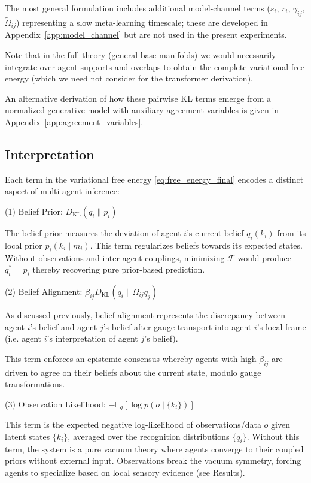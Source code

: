 \documentclass[twoside,11pt]{article}
\begin{document}
The most general formulation includes additional model-channel terms ($s_i$, $r_i$, $\gamma_{ij}$, $\tilde{\Omega}_{ij}$) representing a slow meta-learning timescale; these are developed in Appendix~\ref{app:model_channel} but are not used in the present experiments.

Note that in the full theory (general base manifolds) we would necessarily integrate over agent supports and overlaps to obtain the complete variational free energy (which we need not consider for the transformer derivation).

An alternative derivation of how these pairwise KL terms emerge from a normalized generative model with auxiliary agreement variables is given in Appendix~\ref{app:agreement_variables}.

\subsection{Interpretation}
Each term in the variational free energy \eqref{eq:free_energy_final} encodes a distinct aspect of multi-agent inference:

(1) Belief Prior: $D_{\mathrm{KL}}(q_i \| p_i)$

The belief prior measures the deviation of agent $i$'s current belief $q_i(k_i)$ from its local prior $p_i(k_i \mid m_i)$. This term regularizes beliefs towards its expected states. Without observations and inter-agent couplings, minimizing $\mathcal{F}$ would produce $q_i^* = p_i$ thereby recovering pure prior-based prediction.

(2) Belief Alignment: $\beta_{ij} D_{\mathrm{KL}}(q_i \| \Omega_{ij} q_j)$

As discussed previously, belief alignment represents the discrepancy between agent $i$'s belief and agent $j$'s belief after gauge transport into agent $i$'s local frame (i.e. agent $i$'s interpretation of agent $j$'s belief).

This term enforces an epistemic consensus whereby agents with high $\beta_{ij}$ are driven to agree on their beliefs about the current state, modulo gauge transformations. 

(3) Observation Likelihood: $-\mathbb{E}_q[\log p(o \mid \{k_i\})]$

This term is the expected negative log-likelihood of observations/data $o$ given latent states $\{k_i\}$, averaged over the recognition distributions $\{q_i\}$. Without this term, the system is a pure vacuum theory where agents converge to their coupled priors without external input. Observations break the vacuum symmetry, forcing agents to specialize based on local sensory evidence (see Results).
\end{document}
